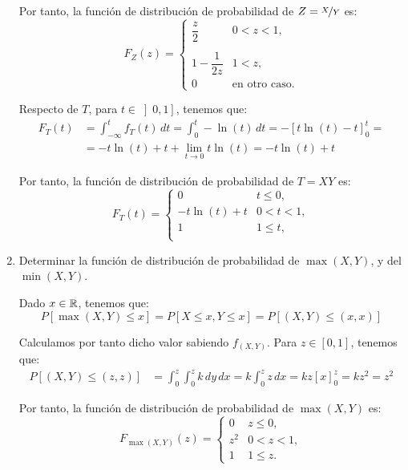 \begin{ejercicio}
\begin{enumerate}
        Por tanto, la función de distribución de probabilidad de $Z=\nicefrac{X}{Y}$ es:
        \begin{equation*}
            F_Z(z) = \begin{cases}
                \dfrac{z}{2} & 0<z<1, \\ \\
                1-\dfrac{1}{2z} & 1<z, \\
                0 & \text{en otro caso}.
            \end{cases}
        \end{equation*}

        Respecto de $T$, para $t\in \left]0,1\right]$, tenemos que:
        \begin{align*}
            F_T(t)&=\int_{-\infty}^{t} f_T(t) \, dt = \int_{0}^{t} -\ln(t) \, dt = -\left[t\ln(t)-t\right]_{0}^{t} =\\&=
            -t\ln(t)+t +\lim_{t\to 0}t\ln(t) = -t\ln(t)+t
        \end{align*}

        Por tanto, la función de distribución de probabilidad de $T=XY$ es:
        \begin{equation*}
            F_T(t) = \begin{cases}
                0 & t\leq 0, \\
                -t\ln(t)+t & 0<t<1, \\
                1 & 1\leq t, \\
            \end{cases}
        \end{equation*}


        \item Determinar la función de distribución de probabilidad de $\max(X,Y)$, y del $\min(X,Y)$.
        
        Dado $x\in \mathbb{R}$, tenemos que:
        \begin{equation*}
            P[\max(X,Y)\leq x]=P[X\leq x,Y\leq x] = P[(X,Y)\leq (x,x)]
        \end{equation*}

        Calculamos por tanto dicho valor sabiendo $f_{(X,Y)}$. Para $z\in [0,1]$, tenemos que:
        \begin{align*}
            P[(X,Y)\leq (z,z)]&=\int_{0}^{z}\int_{0}^{z} k \, dy \, dx = k\int_{0}^{z} z \, dx
            = kz\left[x\right]_{0}^{z} = kz^2 = z^2
        \end{align*}

        Por tanto, la función de distribución de probabilidad de $\max(X,Y)$ es:
        \begin{equation*}
            F_{\max(X,Y)}(z) = \begin{cases}
                0 & z\leq 0, \\
                z^2 & 0<z<1, \\
                1 & 1\leq z.
            \end{cases}
        \end{equation*}


\end{enumerate}
\end{ejercicio}
